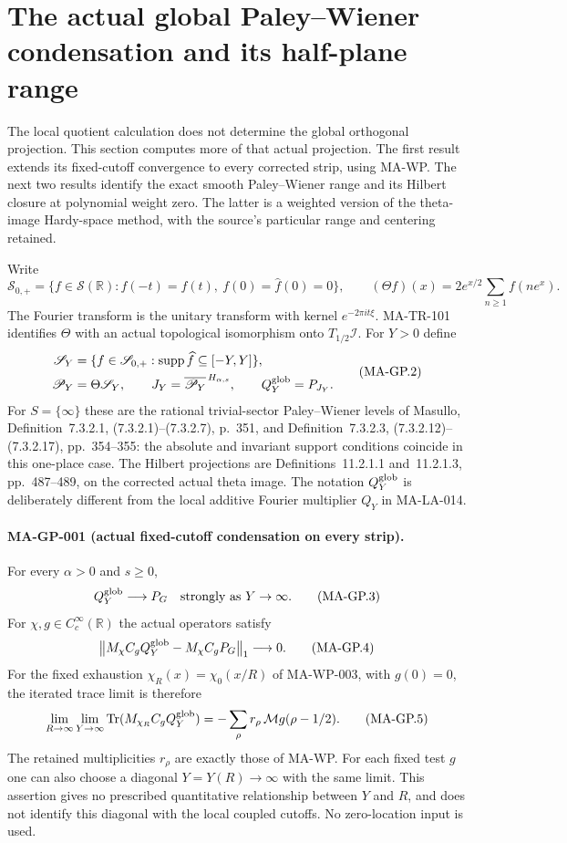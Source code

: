 \section{The actual global Paley--Wiener condensation and its half-plane range}
\label{sec:global-condensation}

The local quotient calculation does not determine the global orthogonal
projection.  This section computes more of that actual projection.  The
first result extends its fixed-cutoff convergence to every corrected
strip, using MA-WP.  The next two results identify the exact smooth
Paley--Wiener range and its Hilbert closure at polynomial weight zero.
The latter is a weighted version of the theta-image Hardy-space method,
with the source's particular range and centering retained.

Write
\[
 \mathscr S_{0,+}=\{f\in\mathscr S(\mathbb R):f(-t)=f(t),
                         \ f(0)=\widehat f(0)=0\},\qquad
 (\Theta f)(x)=2e^{x/2}\sum_{n\ge1}f(ne^x).
 \tag{MA-GP.1}
\]
The Fourier transform is the unitary transform with kernel
$e^{-2\pi it\xi}$.  MA-TR-101 identifies $\Theta$ with an actual
topological isomorphism onto $T_{1/2}\mathcal I$.
For $Y>0$ define
\[
 \begin{aligned}
 \mathscr S_Y&=\{f\in\mathscr S_{0,+}:
                       \operatorname{supp}\widehat f\subseteq[-Y,Y]\},\\
 \mathscr P_Y&=\Theta\mathscr S_Y,\qquad
 J_Y=\overline{\mathscr P_Y}^{\,H_{\alpha,s}},\qquad
 Q_Y^{\rm glob}=P_{J_Y}.
 \end{aligned}
 \tag{MA-GP.2}
\]
For $S=\{\infty\}$ these are the rational trivial-sector
Paley--Wiener levels of Masullo, Definition~7.3.2.1,
(7.3.2.1)--(7.3.2.7), p.~351, and Definition~7.3.2.3,
(7.3.2.12)--(7.3.2.17), pp.~354--355: the absolute and
invariant support conditions coincide in this one-place case.
The Hilbert projections are Definitions~11.2.1.1 and~11.2.1.3,
pp.~487--489, on the corrected actual theta image.  The notation
$Q_Y^{\rm glob}$ is deliberately different from the local additive
Fourier multiplier $Q_Y$ in MA-LA-014.

\paragraph{MA-GP-001 (actual fixed-cutoff condensation on every strip).}
For every $\alpha>0$ and $s\ge0$,
\[
 Q_Y^{\rm glob}\longrightarrow P_G\quad\hbox{strongly as }Y\to\infty.
 \tag{MA-GP.3}
\]
For $\chi,g\in C_c^\infty(\mathbb R)$ the actual operators satisfy
\[
 \bigl\|M_\chi C_gQ_Y^{\rm glob}
                  -M_\chi C_gP_G\bigr\|_1\longrightarrow0.
 \tag{MA-GP.4}
\]
For the fixed exhaustion $\chi_R(x)=\chi_0(x/R)$ of MA-WP-003,
with $g(0)=0$, the iterated trace limit is therefore
\[
 \lim_{R\to\infty}\lim_{Y\to\infty}
        \operatorname{Tr}(M_{\chi_R}C_gQ_Y^{\rm glob})
       =-\sum_\rho r_\rho\,\mathcal Mg(\rho-1/2).
 \tag{MA-GP.5}
\]
The retained multiplicities $r_\rho$ are exactly those of MA-WP.
For each fixed test $g$ one can also choose a diagonal
$Y=Y(R)\to\infty$ with the same limit.  This assertion gives no
prescribed quantitative relationship between $Y$ and $R$, and
does not identify this diagonal with the local coupled cutoffs.
No zero-location input is used.

